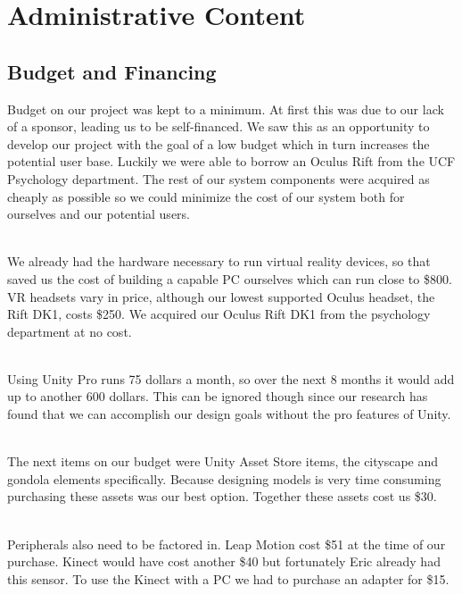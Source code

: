 \documentclass[a4paper,10pt]{article}
\begin{document}
\section{Administrative Content}
\subsection{Budget and Financing}
Budget on our project was kept to a minimum. At first this was due to our lack of a sponsor, leading us to be self-financed. We saw this as an opportunity to develop our project with the goal of a low budget which in turn increases the potential user base. Luckily we were able to borrow an Oculus Rift from the UCF Psychology department. The rest of our system components were acquired as cheaply as possible so we could minimize the cost of our system both for ourselves and our potential users.
\par~\\ 
We already had the hardware necessary to run virtual reality devices, so that saved us the cost of building a capable PC ourselves which can run close to \$800. VR headsets vary in price, although our lowest supported Oculus headset, the Rift DK1, costs \$250. We acquired our Oculus Rift DK1 from the psychology department at no cost.
\par~\\ 
Using Unity Pro runs 75 dollars a month, so over the next 8 months it would add up to another 600 dollars. This can be ignored though since our research has found that we can accomplish our design goals without the pro features of Unity.
\par~\\ 
The next items on our budget were Unity Asset Store items, the cityscape and gondola elements specifically. Because designing models is very time consuming purchasing these assets was our best option. Together these assets cost us \$30.
\par~\\
Peripherals also need to be factored in. Leap Motion cost \$51 at the time of our purchase. Kinect would have cost another \$40 but fortunately Eric already had this sensor. To use the Kinect with a PC we had to purchase an adapter for \$15.

\pagebreak
\end{document}
